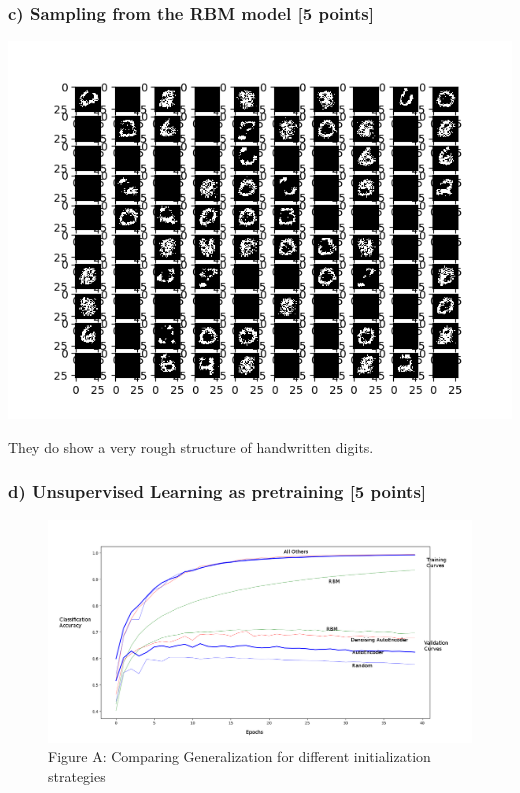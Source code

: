 \documentclass[10pt]{article}
\begin{document}
\subsubsection*{c) Sampling from the RBM model [5 points]}

\includegraphics[scale=0.7]{digit_generation.png}

They do show a very rough structure of handwritten digits.

\subsubsection*{d) Unsupervised Learning as pretraining [5 points]}
  
\begin{figure}
  \caption{Figure A: Comparing Generalization for different initialization strategies}
  \includegraphics[scale=0.5]{classification_initialization_experiment_v1.png}
\end{figure}
\end{document}
